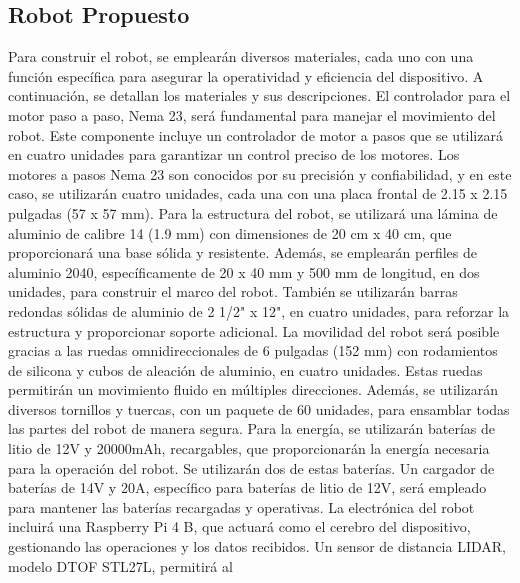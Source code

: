 \subsection{Robot Propuesto} %
\label{sub:Robot Propuesto}
    Para construir el robot, se emplear\'an diversos materiales, cada uno con una funci\'on espec\'ifica para asegurar 
        la operatividad y eficiencia del dispositivo. A continuaci\'on, se detallan los materiales y sus descripciones.
    \vskip 0.5cm
    El controlador para el motor paso a paso, Nema 23, ser\'a fundamental para manejar el movimiento del robot. 
        Este componente incluye un controlador de motor a pasos que se utilizar\'a en cuatro unidades para garantizar 
        un control preciso de los motores. Los motores a pasos Nema 23 son conocidos por su precisi\'on y confiabilidad, 
        y en este caso, se utilizar\'an cuatro unidades, cada una con una placa frontal de 2.15 x 2.15 pulgadas (57 x 57 mm).
    \vskip 0.5cm
    Para la estructura del robot, se utilizar\'a una l\'amina de aluminio de calibre 14 (1.9 mm) con dimensiones de 20 cm x 40 cm, 
        que proporcionar\'a una base s\'olida y resistente. Adem\'as, se emplear\'an perfiles de aluminio 2040, espec\'ificamente de 20 x 
        40 mm y 500 mm de longitud, en dos unidades, para construir el marco del robot. Tambi\'en se utilizar\'an barras redondas 
        s\'olidas de aluminio de 2 1/2" x 12", en cuatro unidades, para reforzar la estructura y proporcionar soporte adicional.
    \vskip 0.5cm
    La movilidad del robot ser\'a posible gracias a las ruedas omnidireccionales de 6 pulgadas (152 mm) con rodamientos de silicona 
        y cubos de aleaci\'on de aluminio, en cuatro unidades. Estas ruedas permitir\'an un movimiento fluido en m\'ultiples direcciones. 
        Adem\'as, se utilizar\'an diversos tornillos y tuercas, con un paquete de 60 unidades, para ensamblar todas las partes del 
        robot de manera segura.
    \vskip 0.5cm
    Para la energ\'ia, se utilizar\'an bater\'ias de litio de 12V y 20000mAh, recargables, que proporcionar\'an la energ\'ia necesaria 
        para la operaci\'on del robot. Se utilizar\'an dos de estas bater\'ias. Un cargador de bater\'ias de 14V y 20A, espec\'ifico 
        para bater\'ias de litio de 12V, ser\'a empleado para mantener las bater\'ias recargadas y operativas.
    \vskip 0.5cm
    La electr\'onica del robot incluir\'a una Raspberry Pi 4 B, que actuar\'a como el cerebro del dispositivo, gestionando 
        las operaciones y los datos recibidos. Un sensor de distancia LIDAR, modelo DTOF STL27L, permitir\'a al 
